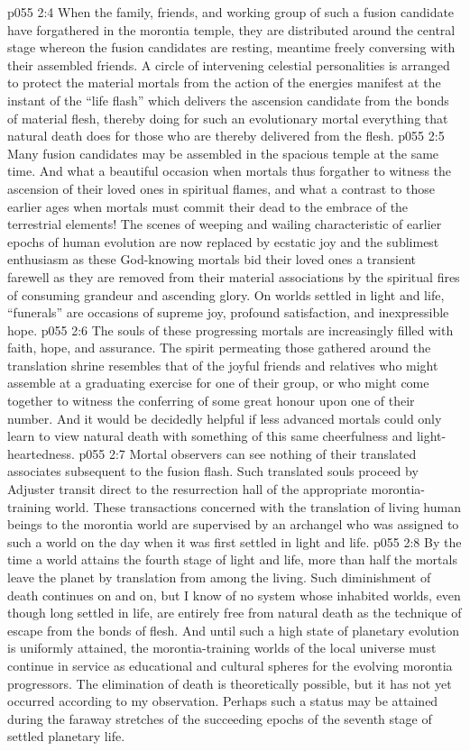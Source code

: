 \vs p055 2:4 \pc When the family, friends, and working group of such a fusion candidate have forgathered in the morontia temple, they are distributed around the central stage whereon the fusion candidates are resting, meantime freely conversing with their assembled friends. A circle of intervening celestial personalities is arranged to protect the material mortals from the action of the energies manifest at the instant of the “life flash” which delivers the ascension candidate from the bonds of material flesh, thereby doing for such an evolutionary mortal everything that natural death does for those who are thereby delivered from the flesh.
\vs p055 2:5 Many fusion candidates may be assembled in the spacious temple at the same time. And what a beautiful occasion when mortals thus forgather to witness the ascension of their loved ones in spiritual flames, and what a contrast to those earlier ages when mortals must commit their dead to the embrace of the terrestrial elements! The scenes of weeping and wailing characteristic of earlier epochs of human evolution are now replaced by ecstatic joy and the sublimest enthusiasm as these God\hyp{}knowing mortals bid their loved ones a transient farewell as they are removed from their material associations by the spiritual fires of consuming grandeur and ascending glory. On worlds settled in light and life, “funerals” are occasions of supreme joy, profound satisfaction, and inexpressible hope.
\vs p055 2:6 The souls of these progressing mortals are increasingly filled with faith, hope, and assurance. The spirit permeating those gathered around the translation shrine resembles that of the joyful friends and relatives who might assemble at a graduating exercise for one of their group, or who might come together to witness the conferring of some great honour upon one of their number. And it would be decidedly helpful if less advanced mortals could only learn to view natural death with something of this same cheerfulness and light\hyp{}heartedness.
\vs p055 2:7 \pc Mortal observers can see nothing of their translated associates subsequent to the fusion flash. Such translated souls proceed by Adjuster transit direct to the resurrection hall of the appropriate morontia\hyp{}training world. These transactions concerned with the translation of living human beings to the morontia world are supervised by an archangel who was assigned to such a world on the day when it was first settled in light and life.
\vs p055 2:8 By the time a world attains the fourth stage of light and life, more than half the mortals leave the planet by translation from among the living. Such diminishment of death continues on and on, but I know of no system whose inhabited worlds, even though long settled in life, are entirely free from natural death as the technique of escape from the bonds of flesh. And until such a high state of planetary evolution is uniformly attained, the morontia\hyp{}training worlds of the local universe must continue in service as educational and cultural spheres for the evolving morontia progressors. The elimination of death is theoretically possible, but it has not yet occurred according to my observation. Perhaps such a status may be attained during the faraway stretches of the succeeding epochs of the seventh stage of settled planetary life.
